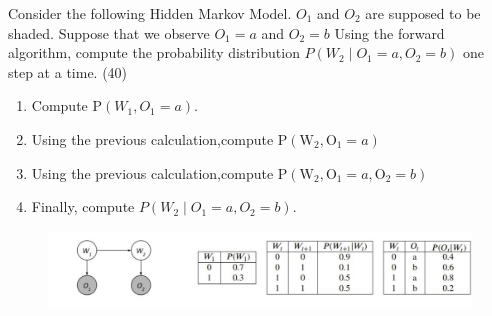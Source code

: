 \newpage

\begin{exercise}[HMM]{ Consider the following Hidden Markov Model. $O_1$ and $O_2$ are supposed to be shaded.  Suppose that we observe $O_{1}=a$ and $O_{2}=b$ Using the forward algorithm, compute the probability distribution $P\left(W_{2} \mid O_{1}=a, O_{2}=b\right)$ one step at a time. (40)
    \begin{enumerate}
        \item Compute $\mathrm{P}\left(W_{1}, O_{1}=a\right)$.
        \item Using the previous calculation,compute $\mathrm{P}\left(\mathrm{W}_{2}, \mathrm{O}_{1}=a\right)$
        \item Using the previous calculation,compute $\mathrm{P}\left(\mathrm{W}_{2}, \mathrm{O}_{1}=a, \mathrm{O}_{2}=b\right)$
        \item Finally, compute $P\left(W_{2} \mid O_{1}=a, O_{2}=b\right)$.
    \end{enumerate}

    \begin{figure}[h]
        \centering
        \includegraphics[width=12cm]{img/ex3-4.jpg}
    \end{figure}
        }
  \begin{solution}
  \par{~}
  \end{solution}
  \label{ex3}
\end{exercise}